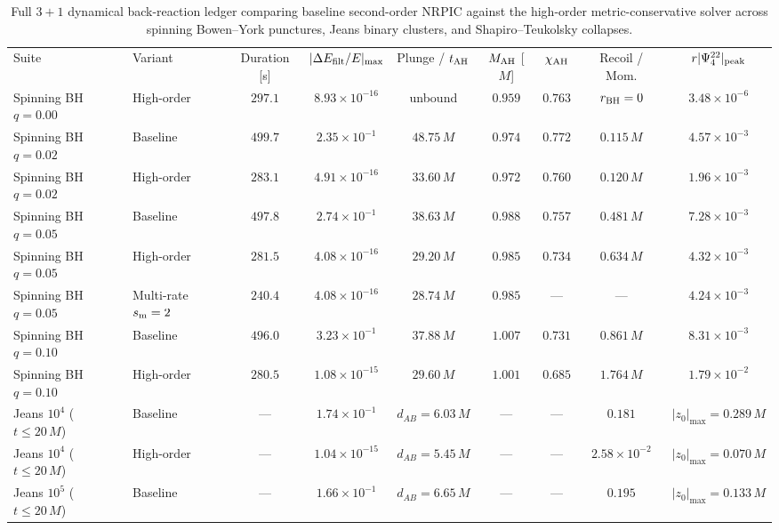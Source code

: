 \begin{table}[tbp]
\caption{\label{tab:bench_backreaction_compare}%
Full $3+1$ dynamical back-reaction ledger comparing baseline second-order NRPIC against the high-order metric-conservative solver across spinning Bowen--York punctures, Jeans binary clusters, and Shapiro--Teukolsky collapses.}
\scriptsize
\setlength{\tabcolsep}{3.0pt}
\begin{ruledtabular}
\begin{tabular}{llccccccc}
Suite & Variant & Duration [s] & $|\Delta E_{\rm filt}/E|_{\max}$ & Plunge / $t_{\rm AH}$ & $M_{\rm AH}$ [$M$] & $\chi_{\rm AH}$ & Recoil / Mom. & $r|\Psi_4^{22}|_{\rm peak}$ \\
\colrule
Spinning BH $q=0.00$ & High-order & $297.1$ & $8.93 \times 10^{-16}$ & unbound & $0.959$ & $0.763$ & $r_{\rm BH} = 0$ & $3.48 \times 10^{-6}$ \\
Spinning BH $q=0.02$ & Baseline & $499.7$ & $2.35 \times 10^{-1}$ & $48.75\,M$ & $0.974$ & $0.772$ & $0.115\,M$ & $4.57 \times 10^{-3}$ \\
Spinning BH $q=0.02$ & High-order & $283.1$ & $4.91 \times 10^{-16}$ & $33.60\,M$ & $0.972$ & $0.760$ & $0.120\,M$ & $1.96 \times 10^{-3}$ \\
Spinning BH $q=0.05$ & Baseline & $497.8$ & $2.74 \times 10^{-1}$ & $38.63\,M$ & $0.988$ & $0.757$ & $0.481\,M$ & $7.28 \times 10^{-3}$ \\
Spinning BH $q=0.05$ & High-order & $281.5$ & $4.08 \times 10^{-16}$ & $29.20\,M$ & $0.985$ & $0.734$ & $0.634\,M$ & $4.32 \times 10^{-3}$ \\
Spinning BH $q=0.05$ & Multi-rate $s_{\rm m}=2$ & $240.4$ & $4.08 \times 10^{-16}$ & $28.74\,M$ & $0.985$ & --- & --- & $4.24 \times 10^{-3}$ \\
Spinning BH $q=0.10$ & Baseline & $496.0$ & $3.23 \times 10^{-1}$ & $37.88\,M$ & $1.007$ & $0.731$ & $0.861\,M$ & $8.31 \times 10^{-3}$ \\
Spinning BH $q=0.10$ & High-order & $280.5$ & $1.08 \times 10^{-15}$ & $29.60\,M$ & $1.001$ & $0.685$ & $1.764\,M$ & $1.79 \times 10^{-2}$ \\
Jeans $10^4$ ($t \le 20\,M$) & Baseline & --- & $1.74 \times 10^{-1}$ & $d_{AB}=6.03\,M$ & --- & --- & $0.181$ & $|z_0|_{\max} = 0.289\,M$ \\
Jeans $10^4$ ($t \le 20\,M$) & High-order & --- & $1.04 \times 10^{-15}$ & $d_{AB}=5.45\,M$ & --- & --- & $2.58 \times 10^{-2}$ & $|z_0|_{\max} = 0.070\,M$ \\
Jeans $10^5$ ($t \le 20\,M$) & Baseline & --- & $1.66 \times 10^{-1}$ & $d_{AB}=6.65\,M$ & --- & --- & $0.195$ & $|z_0|_{\max} = 0.133\,M$ \\

\end{tabular}
\end{ruledtabular}
\end{table}
